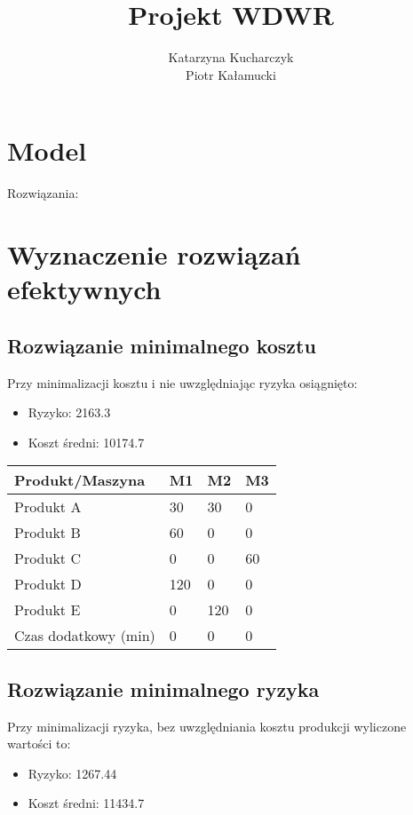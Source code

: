 \documentclass[a4paper,11pt]{report}
\title{Projekt WDWR}
\author{Katarzyna Kucharczyk\\
Piotr Kałamucki}
\begin{document}
\maketitle

\chapter{Model}


Rozwiązania:

\chapter{Wyznaczenie rozwiązań efektywnych}
\section{Rozwiązanie minimalnego kosztu}
Przy minimalizacji kosztu i nie uwzględniając ryzyka osiągnięto:
\begin{itemize}
\item Ryzyko: 2163.3
\item Koszt średni: 10174.7
\end{itemize}

\begin{table}[h!]
\begin{center}
    \begin{tabular}{|l|l|l|l|}\hline
    Produkt/Maszyna& M1 & M2 & M3 \\\hline\hline
    Produkt A      & 30  & 30  & 0  \\\hline
    Produkt B      & 60  & 0  & 0  \\\hline
    Produkt C      & 0  & 0  & 60  \\\hline
    Produkt D      & 120  & 0  & 0  \\\hline
    Produkt E      & 0  & 120  & 0  \\\hline\hline
    Czas dodatkowy (min) & 0  & 0  & 0  \\\hline
    \end{tabular}
\end{center}
\end{table}

\section{Rozwiązanie minimalnego ryzyka}
Przy minimalizacji ryzyka, bez uwzględniania kosztu produkcji wyliczone wartości to:
\begin{itemize}
\item Ryzyko: 1267.44
\item Koszt średni: 11434.7
\end{itemize}
\end{document}
